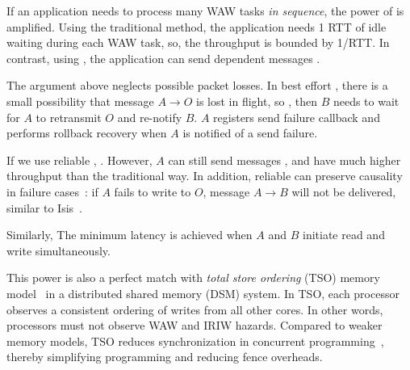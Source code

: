

If an application needs to process many WAW tasks \emph{in sequence}, the power of \sys{} is amplified. Using the traditional method, the application needs 1 RTT of idle waiting during each WAW task, so, the throughput is bounded by 1/RTT. In contrast, using \sys{}, the application can send dependent messages . %

The argument above neglects possible packet losses.
In best effort \sys{}, there is a small possibility that message $A \rightarrow O$ is lost in flight, so , then $B$ needs to wait for $A$ to retransmit $O$ and re-notify $B$.
$A$ registers send failure callback and performs rollback recovery when $A$ is notified of a send failure.

If we use reliable \sys{}, . However, $A$ can still send messages , and have much higher throughput than the traditional way.
In addition, reliable \sys can preserve causality in failure cases~\cite{birman1994response}: if $A$ fails to write to $O$, message $A \rightarrow B$ will not be delivered, similar to Isis~\cite{birman1984overview}.

Similarly,  The minimum latency is achieved when $A$ and $B$ initiate read and write simultaneously.

This power is also a perfect match with \textit{total store ordering} (TSO) memory model~\cite{sewell2010x86} in a distributed shared memory (DSM) system. In TSO, each processor observes a consistent ordering of writes from all other cores. In other words, processors must not observe WAW and IRIW hazards.
Compared to weaker memory models, TSO reduces synchronization in concurrent programming~\cite{morrison2013fast,tassarotti2015verifying}, thereby simplifying programming and reducing fence overheads.


